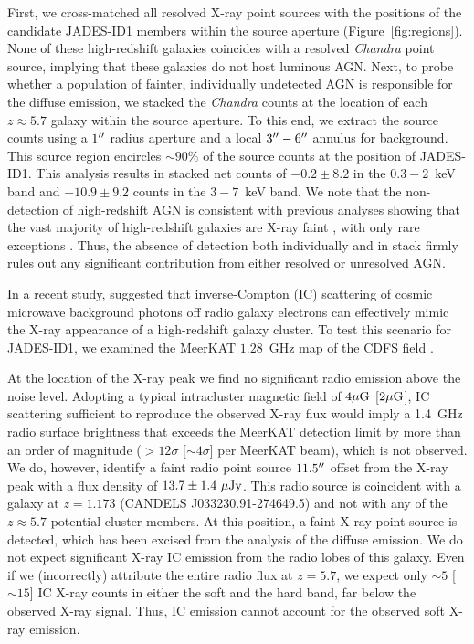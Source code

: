 \documentclass[pdflatex,sn-mathphys-num]{sn-jnl}
\newcommand{\arcsec}{\mbox{\ensuremath{^{\prime\prime}}}}
\theoremstyle{thmstyleone}
\theoremstyle{thmstyletwo}
\theoremstyle{thmstylethree}
\begin{document}
First, we cross-matched all resolved X-ray point sources with the positions of the candidate JADES-ID1 members within the source aperture (Figure~\ref{fig:regions}). None of these high-redshift galaxies coincides with a resolved \textit{Chandra} point source, implying that these galaxies do not host luminous AGN. Next, to probe whether a population of fainter, individually undetected AGN is responsible for the diffuse emission, we stacked the \textit{Chandra} counts at the location of each $z\approx5.7$ galaxy within the source aperture. To this end, we extract the source counts using a $1\arcsec$ radius aperture and a local $3\arcsec-6\arcsec$ annulus for background. This source region encircles $\sim90\%$ of the source counts at the position of JADES-ID1. This analysis results in stacked net counts of $-0.2\pm8.2$ in the $0.3-2$~keV band and $-10.9\pm9.2$ counts in the $3-7$~keV band. We note that the non-detection of high-redshift AGN is consistent with previous analyses showing that the vast majority of high-redshift galaxies are X-ray faint \cite{2024ApJ...969L..18A,2025MNRAS.538.1921M,2025arXiv250509669S}, with only rare exceptions \cite{2024NatAs...8..126B,2024ApJ...965L..21K}. Thus, the absence of detection both individually and in stack firmly rules out any significant contribution from either resolved or unresolved AGN.

In a recent study, \cite{2021ApJ...913..110C} suggested that inverse-Compton (IC) scattering of cosmic microwave background photons off radio galaxy electrons can effectively mimic the X-ray appearance of a high-redshift galaxy cluster. To test this scenario for JADES-ID1, we examined the MeerKAT $1.28$~GHz map of the CDFS field \cite{2025MNRAS.536.2187H}.

At the location of the X-ray peak we find no significant radio emission above the noise level. Adopting a typical intracluster magnetic field \cite{2010A&A...513A..30B,2021NatAs...5..268D} of $4 \rm{\mu G}$ [$2 \rm{\mu G}$], IC scattering sufficient to reproduce the observed X-ray flux would imply a 1.4~GHz radio surface brightness that exceeds the MeerKAT detection limit by more than an order of magnitude ($>12 \sigma$ [$\sim 4\sigma$] per MeerKAT beam), which is not observed.
We do, however, identify a faint radio point source $11.5\arcsec$ offset from the X-ray peak with a flux density of $13.7\pm1.4 \ \rm{\mu Jy}$. This radio source is coincident with a galaxy at $z=1.173$ (CANDELS J033230.91-274649.5) \cite{2023ApJ...945..155M} and not with any of the $z\approx5.7$ potential cluster members.
At this position, a faint X-ray point source is detected, which has been excised from the analysis of the diffuse emission. We do not expect significant X-ray IC emission from the radio lobes of this galaxy.
Even if we (incorrectly) attribute the entire radio flux at $z=5.7$, we expect only $\sim5$ [$\sim 15$] IC X-ray counts in either the soft and the hard band, far below the observed X-ray signal. Thus, IC emission cannot account for the observed soft X-ray emission.
\end{document}
